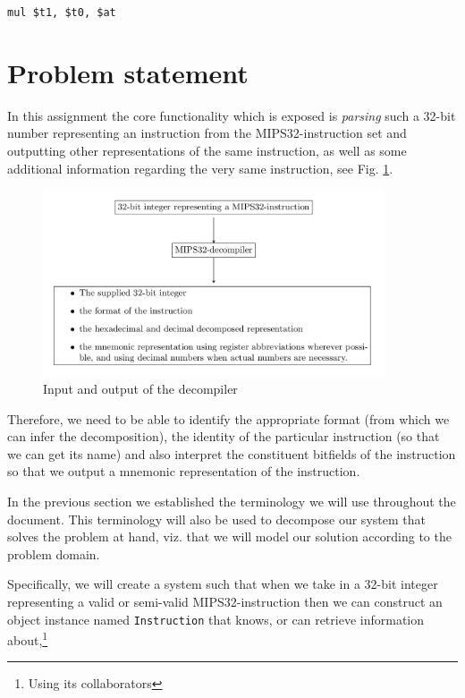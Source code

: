 \documentclass[a4paper]{article}
\newcommand{\mij}[1]{\texttt{#1}}
\begin{document}
\begin{center}
  \texttt{mul \$t1, \$t0, \$at}
\end{center}
\section{Problem statement}\label{section:problem-statement}

In this assignment the core functionality which is exposed is
\emph{parsing} such a 32-bit number representing an instruction from
the MIPS32-instruction set and outputting other representations of the
same instruction, as well as some additional information regarding the
very same instruction, see Fig. \ref{fig:mips32-decompiler}.

\begin{figure}[H]
  \centering
  \includegraphics[width=0.9\textwidth]{figures/mips32-decompiler.png}
  \caption{Input and output of the decompiler}
  \label{fig:mips32-decompiler}
\end{figure}

Therefore, we need to be able to identify the appropriate format (from
which we can infer the decomposition), the identity of the particular
instruction (so that we can get its name) and also interpret the
constituent bitfields of the instruction so that we output a mnemonic
representation of the instruction.

In the previous section we established the terminology we will use
throughout the document. This terminology will also be used to
decompose our system that solves the problem at hand, viz. that
we will model our solution according to the problem domain.

Specifically, we will create a system such that when we take in a
32-bit integer representing a valid or semi-valid MIPS32-instruction
then we can construct an object instance named \mij{Instruction} that
knows, or can retrieve information about,\footnote{Using its
collaborators}
\end{document}
